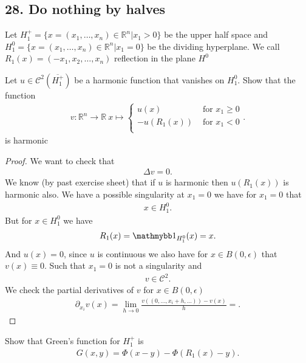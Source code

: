 \subsection*{28. Do nothing by halves}
Let $H^{+}_1  = \{x = (x_{1},\ldots ,x_n)\in  \mathbb{R}^{n} | x_{1} >0 \}   $ be the upper half space and $H^{0}_1  = \{x = (x_{1},\ldots ,x_n)\in  \mathbb{R}^{n} | x_{1} =0 \}   $
be the dividing hyperplane. We call $R_1(x)  = (-x_{1},x_2,\ldots ,x_n)$ reflection in the plane $H^{0} $
\begin{exercise}[a]
  Let $u \in  \mathcal{C}^{2}(\overline{H_1^{+} } ) $ be a harmonic function that vanishes on $H_1^{0} $. Show that the function 
  \begin{align*}
    v : \mathbb{R}^{n} \to  \mathbb{R} \ x \mapsto \begin{cases}
      u(x) &\text{ for } x_{1}\ge 0\\
      -u(R_1(x)) &\text{ for } x_{1}<0\\
    \end{cases} 
  .\end{align*}
  is harmonic
\end{exercise}
\begin{proof}
 We want to check that 
 \begin{align*}
  \Delta v = 0
 .\end{align*}
 We know (by past exercise sheet) that if  $u$ is harmonic then $u(R_{1}(x))$ is harmonic also. 
 We have a possible singularity at $x_{1}=0$ we have for $x_{1}=0$ that 
 \begin{align*}
  x \in  H_1^{0} 
 .\end{align*}
 But for $x\in H_1^{0} $ we have 
 \begin{align*}
   R_{1}(x) =  \cha_{H_1^{0} }(x) = x
 .\end{align*}
  And $u(x) = 0$, since $u$ is continuous we also have 
    for $x \in B(0,\epsilon)$ that $v(x) \equiv 0$. Such that $x_{1} = 0$ is not a singularity and 
    \begin{align*}
      v \in \mathcal{C}^{2} 
    .\end{align*}
  We check the partial derivatives of $v$ for $x \in  B(0,\epsilon)$
  \begin{align*}
    \partial_{x_i} v(x) = \lim_{h\to 0} \frac{v((0,\ldots ,x_i+h,\ldots))-v(x)}{h} = 
  .\end{align*}
\end{proof}
\begin{exercise}[b]
 Show that Green's function for $H_1^{+} $  is 
 \begin{align*}
  G(x,y) = \Phi(x-y) - \Phi(R_1(x)-y)
 .\end{align*}
\end{exercise}
